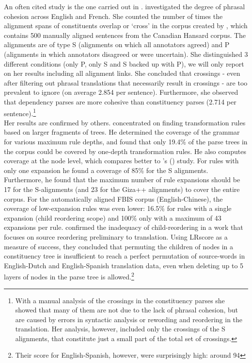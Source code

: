\documentclass{report}
\theoremstyle{definition}
\theoremstyle{plain}
\def\citepos#1{\citeauthor{#1}'s (\citeyear{#1})}
\begin{document}
An often cited study is the one carried out in \cite{fox2002phrasal}. \citeauthor{fox2002phrasal} investigated the degree of phrasal cohesion across English and French. She counted the number of times the alignment spans of constituents overlap or `cross' in the corpus created by \cite{och2000improved}, which contains 500 manually aligned sentences from the Canadian Hansard corpus. The alignments are of type S (alignments on which all annotators agreed) and P (alignments in which annotators disagreed or were uncertain). She distinguished 3 different conditions (only P, only S and S backed up with P), we will only report on her results including all alignment links. She concluded that crossings - even after filtering out phrasal translations that necessarily result in crossings - are too prevalent to ignore (on average 2.854 per sentence). Furthermore, she observed that dependency parses are more cohesive than constituency parses (2.714 per sentence).\footnote{With a manual analysis of the crossings in the constituency parses she showed that many of them are not due to the lack of phrasal cohesion, but are caused by errors in syntactic analysis or rewording and reordering in the translation. Her analysis, however, included only the crossings of the S alignments, that constitute just a small part of the total set of crossings.}\\
Her results are confirmed by others. \cite{galley2004s} concentrated on finding transformation rules based on larger fragments of trees. He determined the coverage of the grammar for various maximum rule depths, and found that only 19.4\% of the parse trees in the corpus could be covered by one-depth transformation rules. He also computes coverage at the node level, which compares better to \citepos{fox2002phrasal} study. For rules with only one expansion he found a coverage of 85\% for the S alignments. Furthermore, he found that the maximum number of rule expansions should be 17 for the S-alignments (and 23 for the Giza++ alignments) to cover the entire corpus. For the automatically aligned FBIS corpus (English-Chinese), the coverage of low-expansion rules was even lower: 16.5\% for rules with a single expansion (child reordering scope) and 100\% only with a maximum of 43 expansions per rule. \cite{khalilov2012statistical} confirmed the inadequacy of child-reordering in a work that focuses on source reordering preliminary to translation. Using LRscore \citep{birch2010lrscore} as a measure of success, they concluded that permuting the children of nodes in a constituency tree is insufficient to reach a perfect permutation of source-words in English-Dutch and English-Spanish translation data, even when deleting up to 5 layers of nodes in the parse tree is allowed.\footnote{Their score for English-Spanish, however, were surprisingly high: around 94}\\
\end{document}
